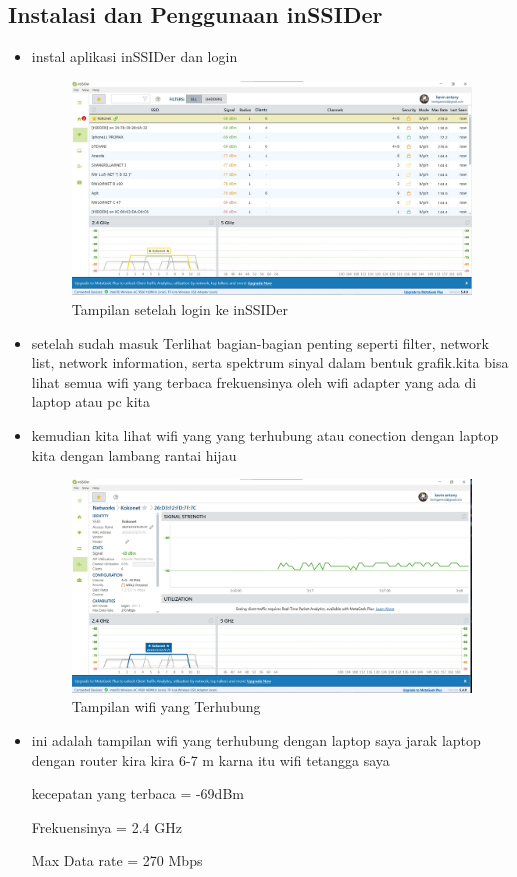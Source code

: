 \documentclass[conference]{IEEEtran}
\begin{document}
\subsection{Instalasi dan Penggunaan inSSIDer}
\begin{itemize}
    \item instal aplikasi inSSIDer dan login 
    \begin{figure}[h]
\centering
    \includegraphics[width=.4\textwidth]{image/004.jpg}
     \caption{Tampilan setelah login ke inSSIDer}
     \end{figure}
     \item setelah sudah masuk Terlihat bagian-bagian 
penting seperti filter, network list, network information, serta spektrum sinyal dalam bentuk grafik.kita bisa lihat semua wifi yang terbaca frekuensinya oleh wifi adapter yang ada di laptop atau pc kita
\vspace{2cm}

\item kemudian kita lihat wifi yang yang terhubung atau conection dengan laptop kita dengan lambang rantai hijau 
    \begin{figure}[h]
\centering
    \includegraphics[width=.4\textwidth]{image/005.jpg}
     \caption{Tampilan wifi yang Terhubung}
     \end{figure}
\item ini adalah tampilan wifi yang terhubung dengan laptop saya jarak laptop dengan router kira kira 6-7 m karna itu wifi tetangga saya 
\vspace{2pt}

kecepatan yang terbaca = -69dBm 
\vspace{1pt}

Frekuensinya = 2.4 GHz
\vspace{1pt}

Max Data rate = 270 Mbps
\vspace{1pt}


\end{itemize}
\end{document}
